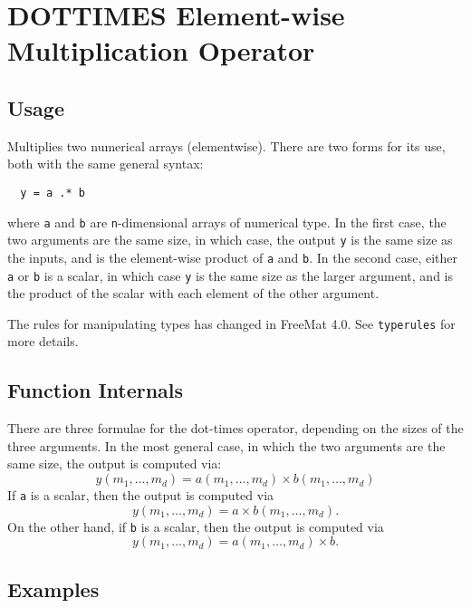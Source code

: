 \section{DOTTIMES Element-wise Multiplication Operator}

\subsection{Usage}

Multiplies two numerical arrays (elementwise).  There are two forms
for its use, both with the same general syntax:
\begin{verbatim}
  y = a .* b
\end{verbatim}
where \verb|a| and \verb|b| are \verb|n|-dimensional arrays of numerical type.  In the
first case, the two arguments are the same size, in which case, the 
output \verb|y| is the same size as the inputs, and is the element-wise
product of \verb|a| and \verb|b|.  In the second case, either \verb|a| or \verb|b| is a scalar, 
in which case \verb|y| is the same size as the larger argument,
and is the product of the scalar with each element of the other argument.


The rules for manipulating types has changed in FreeMat 4.0.  See \verb|typerules|
for more details.

\subsection{Function Internals}

There are three formulae for the dot-times operator, depending on the
sizes of the three arguments.  In the most general case, in which 
the two arguments are the same size, the output is computed via:
\[
y(m_1,\ldots,m_d) = a(m_1,\ldots,m_d) \times b(m_1,\ldots,m_d)
\]
If \verb|a| is a scalar, then the output is computed via
\[
y(m_1,\ldots,m_d) = a \times b(m_1,\ldots,m_d).
\]
On the other hand, if \verb|b| is a scalar, then the output is computed via
\[
y(m_1,\ldots,m_d) = a(m_1,\ldots,m_d) \times b.
\]
\subsection{Examples}

